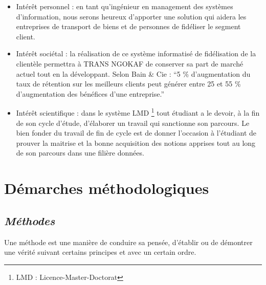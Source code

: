             \begin{itemize}
                \item [\ding{226}] Intérêt personnel : en tant qu’ingénieur en management 
                des systèmes d’information, nous serons heureux d’apporter une solution
                qui aidera les entreprises de transport de biens et de personnes de fidéliser
                le segment client.
                \newline

                \item [\ding{226}] Intérêt sociétal : la réalisation de ce système
                informatisé de fidélisation de la clientèle permettra à TRANS NGOKAF
                de conserver sa part de marché actuel tout en la développant. 
                Selon Bain \& Cie : \enquote{5 \% d’augmentation du taux de
                rétention sur les meilleurs clients peut générer entre 25 et 55 \%
                d’augmentation des bénéfices d’une entreprise.} \cite*{Siecdigi}
                \newline

                \item [\ding{226}] Intérêt scientifique : dans le système LMD
                \footnote[1]{LMD : Licence-Master-Doctorat} tout étudiant
                a le devoir, à la fin de son cycle d’étude, d’élaborer un travail qui
                sanctionne son parcours. Le bien fonder du travail de fin de cycle
                est de donner l’occasion à l’étudiant de prouver la maitrise et la bonne acquisition
                des notions apprises tout au long de son parcours dans une filière données.
            \end{itemize}
    \section[Démarches méthodologiques]{Démarches méthodologiques}
        \subsection[Méthodes]{\textit{Méthodes}}
        Une méthode est une manière de conduire sa pensée, d’établir ou de démontrer une
        vérité suivant certains principes et avec un certain ordre.
        \newline


